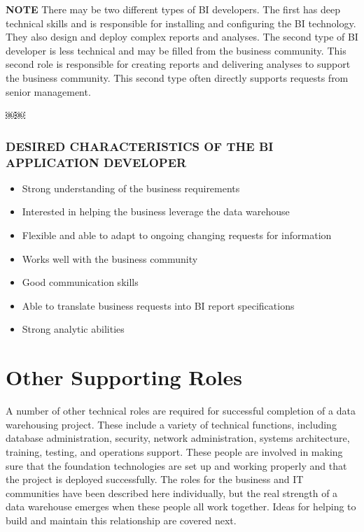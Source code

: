 \documentclass{vldb}
\newcommand{\bi}{\begin{itemize}}
\newcommand{\ei}{\end{itemize}}
\newcommand{\ii}{\item}
\begin{document}
\noindent
\textbf{NOTE} There may be two different types of BI developers. The first has deep technical skills and is responsible for installing and configuring the BI technology. They also design and deploy complex reports and analyses. The second type of BI developer is less technical and may be filled from the business community. This second role is responsible for creating reports and delivering analyses to support the business community. This second type often directly supports requests from
senior management.

￼￼\subsubsection*{DESIRED CHARACTERISTICS OF THE BI APPLICATION DEVELOPER}

\bi
\ii Strong understanding of the business requirements
\ii Interested in helping the business leverage the data warehouse
\ii Flexible and able to adapt to ongoing changing requests for information 
\ii Works well with the business community
\ii Good communication skills
\ii Able to translate business requests into BI report specifications
\ii Strong analytic abilities
\ei

\section{Other Supporting Roles}
A number of other technical roles are required for successful completion of a data warehousing project. These include a variety of technical functions, including database administration, security, network administration, systems architecture, training, testing, and operations support. These people are involved in making sure that the foundation technologies are set up and working properly and that the project is deployed successfully.
The roles for the business and IT communities have been described here individually, but the real strength of a data warehouse emerges when these people all work together. Ideas for helping to build and maintain this relationship are covered next.



\end{document}
